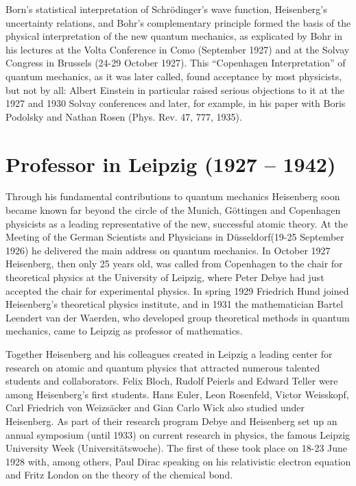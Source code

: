 \documentclass{article}
\begin{document}
Born's statistical interpretation of Schrödinger's wave function, Heisenberg's uncertainty relations, and Bohr's complementary principle formed the basis of the physical interpretation of the new quantum mechanics, as explicated by Bohr in his lectures at the Volta Conference in Como (September 1927) and at the Solvay Congress in Brussels (24-29 October 1927). This “Copenhagen Interpretation” of quantum mechanics, as it was later called, found acceptance by most physicists, but not by all: Albert Einstein in particular raised serious objections to it at the 1927 and 1930 Solvay conferences and later, for example, in his paper with Boris Podolsky and Nathan Rosen (Phys. Rev. 47, 777, 1935).

\section{Professor in Leipzig (1927 – 1942)}

Through his fundamental contributions to quantum mechanics Heisenberg soon became known far beyond the circle of the Munich, Göttingen and Copenhagen physicists as a leading representative of the new, successful atomic theory. At the Meeting of the German Scientists and Physicians in Düsseldorf(19-25 September 1926) he delivered the main address on quantum mechanics. In October 1927 Heisenberg, then only 25 years old, was called from Copenhagen to the chair for theoretical physics at the University of Leipzig, where Peter Debye had just accepted the chair for experimental physics. In spring 1929 Friedrich Hund joined Heisenberg's theoretical physics institute, and in 1931 the mathematician Bartel Leendert van der Waerden, who developed group theoretical methods in quantum mechanics, came to Leipzig as professor of mathematics.

Together Heisenberg and his colleagues created in Leipzig a leading center for research on atomic and quantum physics that attracted numerous talented students and collaborators. Felix Bloch, Rudolf Peierls and Edward Teller were among Heisenberg's first students. Hans Euler, Leon Rosenfeld, Victor Weisskopf, Carl Friedrich von Weizsäcker and Gian Carlo Wick also studied under Heisenberg. As part of their research program Debye and Heisenberg set up an annual symposium (until 1933) on current research in physics, the famous Leipzig University Week (Universitätswoche). The first of these took place on 18-23 June 1928 with, among others, Paul Dirac speaking on his relativistic electron equation and Fritz London on the theory of the chemical bond.
\end{document}

